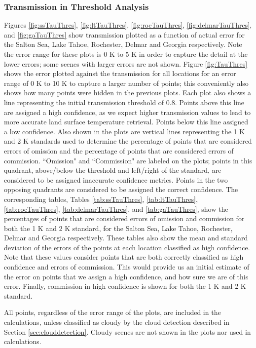 \documentclass{book}
\begin{document}
\subsubsection{Transmission in Threshold Analysis}

Figures \ref{fig:ssTauThres}, \ref{fig:ltTauThres}, \ref{fig:rocTauThres}, \ref{fig:delmarTauThres}, and \ref{fig:gaTauThres} show transmission plotted as a function of actual error for the Salton Sea, Lake Tahoe, Rochester, Delmar and Georgia respectively.  Note the error range for these plots is 0 K to 5 K in order to capture the detail at the lower errors; some scenes with larger errors are not shown.  Figure \ref{fig:TauThres} shows the error plotted against the transmission for all locations for an error range of 0 K to 10 K to capture a larger number of points; this conveniently also shows how many points were hidden in the previous plots.  Each plot also shows a line representing the initial transmission threshold of 0.8.  Points above this line are assigned a high confidence, as we expect higher transmission values to lead to more accurate land surface temperature retrieval.  Points below this line assigned a low confidence.  Also shown in the plots are vertical lines representing the 1 K and 2 K standards used to determine the percentage of points that are considered errors of omission and the percentage of points that are considered errors of commission.  ``Omission" and ``Commission" are labeled on the plots; points in this quadrant, above/below the threshold and left/right of the standard, are considered to be assigned inaccurate confidence metrics.  Points in the two opposing quadrants are considered to be assigned the correct confidence.  The corresponding tables, Tables \ref{tab:ssTauThres}, \ref{tab:ltTauThres}, \ref{tab:rocTauThres}, \ref{tab:delmarTauThres}, and \ref{tab:gaTauThres}, show the percentages of points that are considered errors of omission and commission for both the 1 K and 2 K standard, for the Salton Sea, Lake Tahoe, Rochester, Delmar and Georgia respectively.  These tables also show the mean and standard deviation of the errors of the points at each location classified as high confidence.  Note that these values consider points that are both correctly classified as high confidence and errors of commission.  This would provide us an initial estimate of the error on points that we assign a high confidence, and how sure we are of this error.  Finally, commission in high confidence is shown for both the 1 K and 2 K standard.

All points, regardless of the error range of the plots, are included in the calculations, unless classified as cloudy by the cloud detection described in Section \ref{sec:clouddetection}.  Cloudy scenes are not shown in the plots nor used in calculations.
\end{document}
